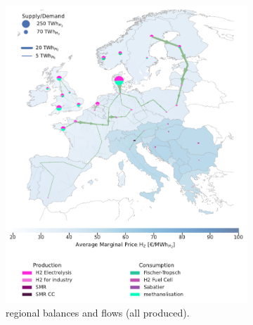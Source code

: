 \documentclass[final,5p,times,twocolumn]{elsarticle}
\begin{document}
\begin{figure}[!htbp]
  \centering
  \begin{subfigure}[t]{0.47\textwidth} %
      \vspace{0pt}
      \includegraphics[width=\textwidth]{balance_map_h2_base} %
      \vspace{0.3cm}
      \caption{ regional balances and flows (all  produced).}
      \label{fig:balance_map_h2_base}
  \end{subfigure}
  \hfill
  \begin{subfigure}[t]{0.47\textwidth} %
      \vspace{0pt}

\end{subfigure}
\end{figure}
\end{document}
